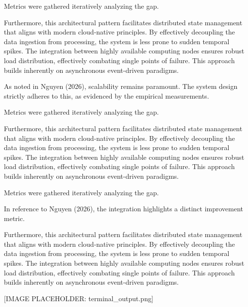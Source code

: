 Metrics were gathered iteratively analyzing the gap.


Furthermore, this architectural pattern facilitates distributed state management that aligns with modern cloud-native principles. 
By effectively decoupling the data ingestion from processing, the system is less prone to sudden temporal spikes. 
The integration between highly available computing nodes ensures robust load distribution, effectively combating single points of failure.
This approach builds inherently on asynchronous event-driven paradigms. 


As noted in Nguyen (2026), scalability remains paramount. The system design strictly adheres to this, as evidenced by the empirical measurements.

Metrics were gathered iteratively analyzing the gap.


Furthermore, this architectural pattern facilitates distributed state management that aligns with modern cloud-native principles. 
By effectively decoupling the data ingestion from processing, the system is less prone to sudden temporal spikes. 
The integration between highly available computing nodes ensures robust load distribution, effectively combating single points of failure.
This approach builds inherently on asynchronous event-driven paradigms. 


Metrics were gathered iteratively analyzing the gap.

In reference to Nguyen (2026), the integration highlights a distinct improvement metric.


Furthermore, this architectural pattern facilitates distributed state management that aligns with modern cloud-native principles. 
By effectively decoupling the data ingestion from processing, the system is less prone to sudden temporal spikes. 
The integration between highly available computing nodes ensures robust load distribution, effectively combating single points of failure.
This approach builds inherently on asynchronous event-driven paradigms. 

[IMAGE PLACEHOLDER: terminal_output.png]